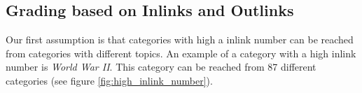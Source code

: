 \subsection{Grading based on Inlinks and Outlinks} %
Our first assumption is that categories with high a inlink number can be reached from categories with different topics. An example of a category with a high inlink number is  \emph{World War II}. This category can be reached from 87 different categories (see figure \ref{fig:high_inlink_number}). 



